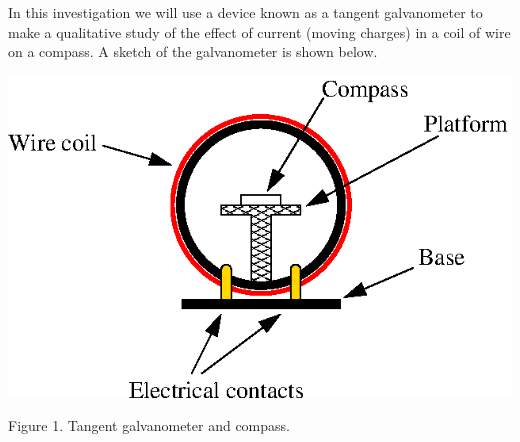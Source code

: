 In this investigation we will use a device known as a tangent galvanometer to make a qualitative study of the effect of current (moving charges) in a coil of wire on a compass. A sketch of the galvanometer is shown below.

\begin{center}
\includegraphics{tangent_galvanometer.eps}
\par
Figure 1. Tangent galvanometer and compass.
\end{center}

